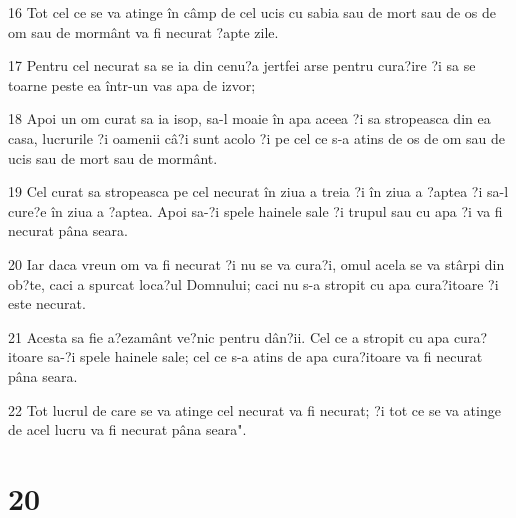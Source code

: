 \par 16 Tot cel ce se va atinge în câmp de cel ucis cu sabia sau de mort sau de os de om sau de mormânt va fi necurat ?apte zile.
\par 17 Pentru cel necurat sa se ia din cenu?a jertfei arse pentru cura?ire ?i sa se toarne peste ea într-un vas apa de izvor;
\par 18 Apoi un om curat sa ia isop, sa-l moaie în apa aceea ?i sa stropeasca din ea casa, lucrurile ?i oamenii câ?i sunt acolo ?i pe cel ce s-a atins de os de om sau de ucis sau de mort sau de mormânt.
\par 19 Cel curat sa stropeasca pe cel necurat în ziua a treia ?i în ziua a ?aptea ?i sa-l cure?e în ziua a ?aptea. Apoi sa-?i spele hainele sale ?i trupul sau cu apa ?i va fi necurat pâna seara.
\par 20 Iar daca vreun om va fi necurat ?i nu se va cura?i, omul acela se va stârpi din ob?te, caci a spurcat loca?ul Domnului; caci nu s-a stropit cu apa cura?itoare ?i este necurat.
\par 21 Acesta sa fie a?ezamânt ve?nic pentru dân?ii. Cel ce a stropit cu apa cura?itoare sa-?i spele hainele sale; cel ce s-a atins de apa cura?itoare va fi necurat pâna seara.
\par 22 Tot lucrul de care se va atinge cel necurat va fi necurat; ?i tot ce se va atinge de acel lucru va fi necurat pâna seara".

\chapter{20}

